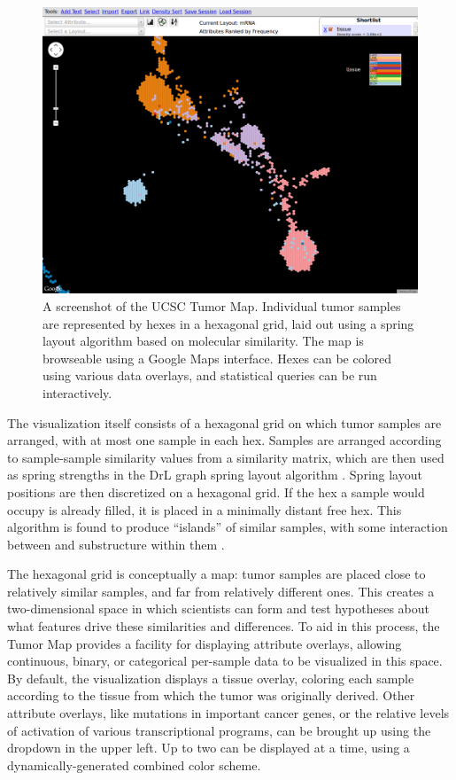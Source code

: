\documentclass[11pt,proposal]{ucthesis}
\begin{document}
\begin{figure}[ht]
    \centering
    \includegraphics[width=1.0\textwidth]{figures/tumormap.png}
    \caption[A screenshot of the UCSC Tumor Map]{A screenshot of the UCSC Tumor Map. Individual tumor samples are represented by hexes in a hexagonal grid, laid out using a spring layout algorithm based on molecular similarity. The map is browseable using a Google Maps interface. Hexes can be colored using various data overlays, and statistical queries can be run interactively.}
    \label{fig:tumormap}
\end{figure}

The visualization itself consists of a hexagonal grid on which tumor samples are arranged, with at most one sample in each hex. Samples are arranged according to sample-sample similarity values from a similarity matrix, which are then used as spring strengths in the DrL graph spring layout algorithm \cite{martin2008drl}. Spring layout positions are then discretized on a hexagonal grid. If the hex a sample would occupy is already filled, it is placed in a minimally distant free hex. This algorithm is found to produce ``islands'' of similar samples, with some interaction between and substructure within them \cite{novak2014ucsc}.

The hexagonal grid is conceptually a map: tumor samples are placed close to relatively similar samples, and far from relatively different ones. This creates a two-dimensional space in which scientists can form and test hypotheses about what features drive these similarities and differences. To aid in this process, the Tumor Map provides a facility for displaying attribute overlays, allowing continuous, binary, or categorical per-sample data to be visualized in this space. By default, the visualization displays a tissue overlay, coloring each sample according to the tissue from which the tumor was originally derived. Other attribute overlays, like mutations in important cancer genes, or the relative levels of activation of various transcriptional programs, can be brought up using the dropdown in the upper left. Up to two can be displayed at a time, using a dynamically-generated combined color scheme.
\end{document}
